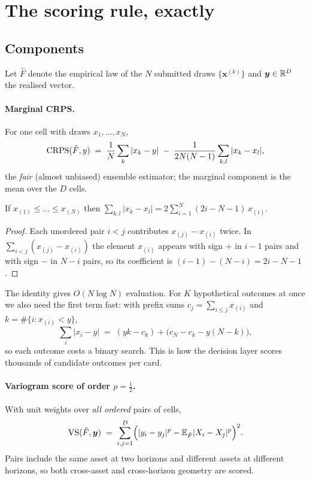 \section{The scoring rule, exactly}\label{sec:scoring}

\subsection{Components}

Let $\hat F$ denote the empirical law of the $N$ submitted draws $\{\bm x^{(k)}\}$ and $\bm y\in\mathbb{R}^D$ the realised vector.

\paragraph{Marginal CRPS.} For one cell with draws $x_1,\dots,x_N$,
\begin{equation}\label{eq:crps}
  \operatorname{CRPS}(\hat F,y) \;=\; \frac1N\sum_{k}|x_k-y| \;-\; \frac{1}{2N(N-1)}\sum_{k,l}|x_k-x_l|,
\end{equation}
the \emph{fair} (almost unbiased) ensemble estimator; the marginal component is the mean over the $D$ cells.

\begin{lemma}\label{lem:sorted}
If $x_{(1)}\le\dots\le x_{(N)}$ then $\sum_{k,l}|x_k-x_l|=2\sum_{i=1}^N(2i-N-1)\,x_{(i)}$.
\end{lemma}
\begin{proof}
Each unordered pair $i<j$ contributes $x_{(j)}-x_{(i)}$ twice. In $\sum_{i<j}(x_{(j)}-x_{(i)})$ the element $x_{(i)}$ appears with sign $+$ in
$i-1$ pairs and with sign $-$ in $N-i$ pairs, so its coefficient is $(i-1)-(N-i)=2i-N-1$.
\end{proof}
The identity gives $O(N\log N)$ evaluation. For $K$ hypothetical outcomes at once we also need the first term fast: with prefix sums
$c_j=\sum_{i\le j}x_{(i)}$ and $k=\#\{i:x_{(i)}<y\}$,
\begin{equation}
  \sum_i|x_i-y| \;=\; (yk-c_k) + \bigl(c_N-c_k-y(N-k)\bigr),
\end{equation}
so each outcome costs a binary search. This is how the decision layer scores thousands of candidate outcomes per card.

\paragraph{Variogram score of order $p=\tfrac12$.} With unit weights over \emph{all ordered} pairs of cells,
\begin{equation}\label{eq:vs}
  \operatorname{VS}(\hat F,\bm y) \;=\; \sum_{i,j=1}^{D}\Bigl(|y_i-y_j|^{p}-\mathbb{E}_{\hat F}|X_i-X_j|^{p}\Bigr)^2 .
\end{equation}
Pairs include the same asset at two horizons and different assets at different horizons, so both cross-asset and cross-horizon geometry
are scored.

